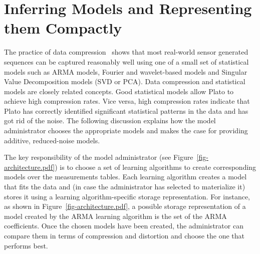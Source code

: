 
\section{Inferring Models and Representing them Compactly}
\label{sec:compression}
The practice of data compression~\cite{DBLP:books/mk/Sayood12} shows that most
real-world sensor generated sequences can be captured reasonably
well using one of a small set of statistical models such as ARMA
models, Fourier and wavelet-based models and Singular Value
Decomposition models (SVD or PCA). 
Data compression and statistical models are closely related
concepts. Good statistical models allow Plato to achieve high
compression rates. Vice versa, high compression rates indicate
that Plato has correctly identified significant statistical patterns
in the data and has got rid of the noise. The following discussion
explains how the model administrator chooses the appropriate models
and makes the case for providing additive, reduced-noise models.

The key responsibility of the model administrator (see Figure~\ref{fig-architecture.pdf}) is to choose a set of learning algorithms to create corresponding models over the measurements tables. Each learning algorithm creates a model that fits the data and (in case the administrator has selected to materialize it) stores it using a learning algorithm-specific storage representation. For instance, as shown in Figure~\ref{fig-architecture.pdf}, a possible storage representation of a model created by the ARMA learning algorithm is the set of the ARMA coefficients. Once the chosen models have been created, the administrator can compare them in terms of compression and distortion and choose the one that performs best.


